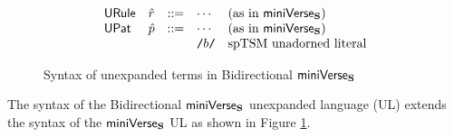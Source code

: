 \begin{figure}
\[\begin{array}{lllllll}
\mathsf{URule} & \hat{r} & ::= 
& \cdots & \text{(as in $\mathsf{miniVerse}_\textbf{S}$)}\\
\mathsf{UPat} & \hat{p} & ::= 
& \cdots & \text{(as in $\mathsf{miniVerse}_\textbf{S}$)}\\
&&& {\texttt{/}b\texttt{/}} & \text{spTSM unadorned literal}
\end{array}\]\vspace{-8px}
\caption[Syntax of unexpanded terms in Bidirectional $\miniVersePat$]{Syntax of unexpanded terms in Bidirectional $\miniVersePat$}
\vspace{-5px}
\label{fig:B-unexpanded-terms}
\end{figure}
The syntax of the Bidirectional $\miniVersePat$ unexpanded language (UL) extends the syntax of the $\miniVersePat$ UL as shown in Figure \ref{fig:B-unexpanded-terms}.

